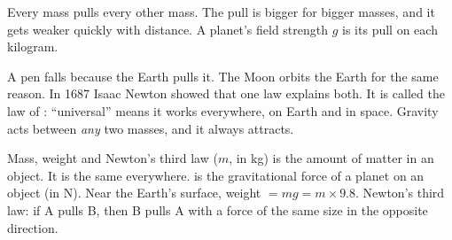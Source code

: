 \begin{bigidea}
Every mass pulls every other mass. The pull is bigger for bigger masses, and it gets weaker
quickly with distance. A planet's field strength $g$ is its pull on each kilogram.
\end{bigidea}

\begin{keywords}
\end{keywords}

A pen falls because the Earth pulls it. The Moon orbits the Earth for the same reason. In 1687
Isaac Newton showed that one law explains both. It is called the law of : ``universal'' means it works everywhere, on Earth and in space. Gravity acts between \emph{any}
two masses, and it always attracts.

\begin{refresher}{Mass, weight and Newton's third law}
 ($m$, in kg) is the amount of matter in an object. It is the same everywhere.
 is the gravitational force of a planet on an object (in N). Near the Earth's
surface, weight $= mg = m \times 9.8$. Newton's third law: if A pulls B, then B pulls A with a
force of the same size in the opposite direction.
\end{refresher}

